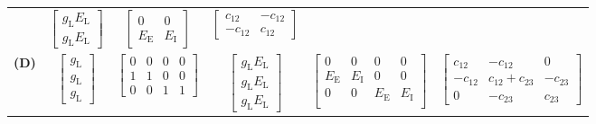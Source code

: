 \begin{table}
\begin{tabular}{c c c c c c}
			& $\displaystyle \begin{bmatrix}
				g_\mathrm{L} E_\mathrm{L} \\
				g_\mathrm{L} E_\mathrm{L}
			\end{bmatrix}$
			& $\displaystyle \begin{bmatrix}
				0 & 0 \\
				E_\mathrm{E} & E_\mathrm{I}
			\end{bmatrix}$
			& $\displaystyle \begin{bmatrix} c_{12} & -c_{12} \\ -c_{12} & c_{12} \end{bmatrix}$ \\[0.5cm]
			\textbf{(D)} 
			& $\displaystyle \begin{bmatrix}
				g_\mathrm{L} \\
				g_\mathrm{L} \\
				g_\mathrm{L}
			\end{bmatrix}$
			& $\displaystyle \begin{bmatrix}
			    0 & 0 & 0 & 0\\
				1 & 1 & 0 & 0 \\
				0 & 0 & 1 & 1 \end{bmatrix}$
			& $\displaystyle \begin{bmatrix}
				g_\mathrm{L} E_\mathrm{L} \\
				g_\mathrm{L} E_\mathrm{L} \\
				g_\mathrm{L} E_\mathrm{L}
			\end{bmatrix}$
			& $\displaystyle \begin{bmatrix}
				0 & 0 & 0 & 0 \\
				E_\mathrm{E} & E_\mathrm{I} & 0 & 0 \\
				0 & 0 & E_\mathrm{E} & E_\mathrm{I} \\
			\end{bmatrix}$
			& $\displaystyle \begin{bmatrix} c_{12} & -c_{12} & 0 \\ -c_{12} & c_{12} + c_{23} & -c_{23} \\ 0 & -c_{23} & c_{23} \end{bmatrix}$ 			\\
		\bottomrule
	\end{tabular}
\end{table}


